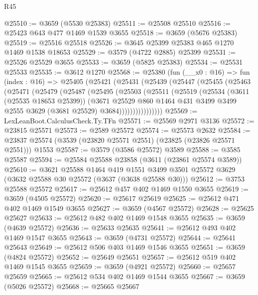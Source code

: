 \begin{lexlean}{R45}
\begin{coremodule}
@25510 := @3659 (@5530 @25383)
@25511 := @25508 @25510
@25516 := @25423 @643 @477 @1469 @1539 @3655
@25518 := @3659 (@5676 @25383)
@25519 := @25516 @25518
@25526 := @3645 @25399 @25383 @465 @1270 @1469 @1538 @18653
@25529 := @3579 (@4722 @2885) @25399
@25531 := @25526 @25529 @3655
@25533 := @3659 (@5825 @25383)
@25534 := @25531 @25533
@25535 := @3612 @1270
@25568 := @25380
    (fun (__x0 : @16) =>
    fun (index : @16) =>
    @25405
      (@25421
        (@25431
          (@25439
            (@25447
              (@25455
                (@25463
                  (@25471
                    (@25479
                      (@25487
                        (@25495
                          (@25503
                            (@25511
                              (@25519
                                (@25534
                                  (@3611 (@25535 @18653 @25399))
                                  (@3671
                                    @25529
                                    @860
                                    @1464
                                    @431
                                    @3499
                                    @3499
                                    @2555
                                    @3629
                                    (@3681 @25529)
                                    @3684))))))))))))))))
@25569 := LexLeanBoot.CalculusCheck.Ty.TFn
@25571 := @25569 @2971 @3136
@25572 := @23815 @25571
@25573 := @2589 @25572
@25574 := @25573 @2632
@25584 := @23837 @25574 (@3539 (@23820 @25571 @2551) (@23825 (@23826 @25571 @2551))) @1553
@25587 := @3579 (@3586 @25572) @3589
@25588 := @3585 @25587
@25594 := @25584 @25588 @23858 (@3611 (@23861 @25574 @3589))
@25610 := @3621
    @25588
    @1464
    @419
    @1551
    @3499
    @3501
    @25572
    @3629
    (@3632 @25588 @30 @25572 (@3637 (@3638 @25588 @30)))
@25612 := @3753 @25588 @25572
@25617 := @25612 @457 @402 @1469 @1550 @3655
@25619 := @3659 (@4505 @25572)
@25620 := @25617 @25619
@25625 := @25612 @471 @402 @1469 @1549 @3655
@25627 := @3659 (@4567 @25572)
@25628 := @25625 @25627
@25633 := @25612 @482 @402 @1469 @1548 @3655
@25635 := @3659 (@4639 @25572)
@25636 := @25633 @25635
@25641 := @25612 @493 @402 @1469 @1547 @3655
@25643 := @3659 (@4731 @25572)
@25644 := @25641 @25643
@25649 := @25612 @506 @403 @1469 @1546 @3655
@25651 := @3659 (@4824 @25572)
@25652 := @25649 @25651
@25657 := @25612 @519 @402 @1469 @1545 @3655
@25659 := @3659 (@4921 @25572)
@25660 := @25657 @25659
@25665 := @25612 @534 @402 @1469 @1544 @3655
@25667 := @3659 (@5026 @25572)
@25668 := @25665 @25667

\end{coremodule}
\end{lexlean}
